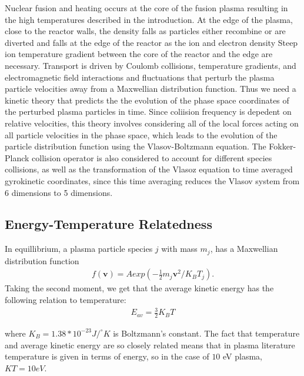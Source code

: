 \documentclass{article}
\begin{document}
Nuclear fusion and heating occurs at the core of the fusion plasma resulting in the high temperatures described in the introduction. At the edge of the plasma, close to the reactor walls, the density falls as particles either recombine or are diverted and falls at the edge of the reactor as the ion and electron density Steep ion temperature gradient between the core of the reactor and the edge are necessary. Transport is driven by Coulomb collisions, temperature gradients,  and  electromagnetic field interactions and fluctuations that perturb the plasma particle velocities away from a Maxwellian distribution function. Thus we need a kinetic theory that predicts the the evolution of the phase space coordinates of the perturbed plasma particles in time. Since coliision frequency is depedent on relative velocities, this theory involves considering all of the local forces acting on all particle velocities in the phase space, which leads to the evolution of the particle distribution function using the Vlasov-Boltzmann equation. The Fokker-Planck collision operator is also considered to account for different species collisions, as well as the transformation of the Vlasoz equation to time averaged gyrokinetic coordinates, since this time averaging reduces the Vlasov system from 6 dimensions to 5 dimensions.

\subsection{Energy-Temperature Relatedness}


In equillibrium, a plasma particle species $j$ with mass $m_j$, has a  Maxwellian distribution function
\begin{align*}
f(\textbf{v}) = Aexp(-\frac{1}{2}m_j \textbf{v}^2/K_BT_j). 
\end{align*}
Taking the second moment, we get that the average kinetic energy has the following relation to temperature:
\begin{align*}
E_{av} = \frac{3}{2} K_BT
\end{align*}

where $K_B=1.38*10^{-23}J/^{\circ}K$ is Boltzmann's constant. The fact that temperature and average kinetic energy are so closely related means that in plasma literature temperature is given in terms of energy, so in the case of $10$ eV plasma, $KT =10eV$.\\
\end{document}
